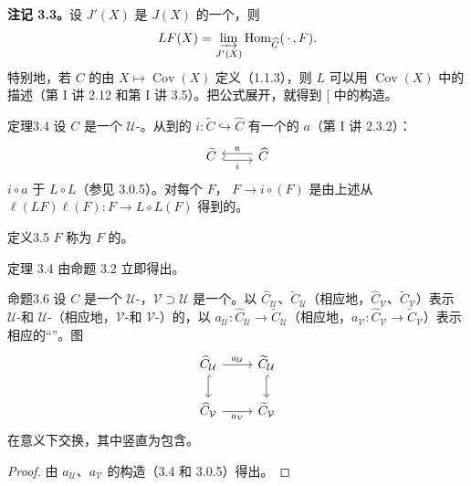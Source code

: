 \textbf{注记 3.3。}设 $J'(X)$ 是 $J(X)$ 的一个，则
\[LF(X)=\varinjlim_{J'(X)}\operatorname{Hom}_{\widehat C}(\,\cdot\,,F).\]
特别地，若 $C$ 的由 $X\mapsto\operatorname{Cov}(X)$ 定义（1.1.3），则 $L$ 可以用 $\operatorname{Cov}(X)$ 中的描述（第 I 讲 2.12 和第 I 讲 3.5）。把公式展开，就得到 [ 中的构造。
\begin{SGAresult}{定理}{3.4}
设 $C$ 是一个 $\mathcal U$-。从到的 $i:\widetilde C\hookrightarrow\widehat C$ 有一个的 $a$（第 I 讲 2.3.2）：
\[\begin{tikzcd}\widetilde C\arrow[r,hook,shift right=0.6ex,"i"']&\widehat C\arrow[l,shift right=0.6ex,"a"']\end{tikzcd}\]
 $i\circ a$ 于 $L\circ L$（参见 3.0.5）。对每个 $F$， $F\to i\circ(F)$ 是由上述从 $\ell(LF)\ell(F):F\to L\circ L(F)$ 得到的。
\end{SGAresult}
\begin{SGAresult}{定义}{3.5}
 $F$ 称为 $F$ 的。
\end{SGAresult}
定理 3.4 由命题 3.2 立即得出。
\begin{SGAresult}{命题}{3.6}
设 $C$ 是一个 $\mathcal U$-，$\mathcal V\supset\mathcal U$ 是一个。以 $\widehat C_{\mathcal U}$、$\widetilde C_{\mathcal U}$（相应地，$\widehat C_{\mathcal V}$、$\widetilde C_{\mathcal V}$）表示 $\mathcal U$-和 $\mathcal U$-（相应地，$\mathcal V$-和 $\mathcal V$-）的，以 $a_{\mathcal U}:\widehat C_{\mathcal U}\to\widetilde C_{\mathcal U}$（相应地，$a_{\mathcal V}:\widehat C_{\mathcal V}\to\widetilde C_{\mathcal V}$）表示相应的“”。图
\[\begin{tikzcd}
\widehat C_{\mathcal U}\arrow[r,"a_{\mathcal U}"]\arrow[d,hook]&\widetilde C_{\mathcal U}\arrow[d,hook]\\
\widehat C_{\mathcal V}\arrow[r,"a_{\mathcal V}"']&\widetilde C_{\mathcal V}
\end{tikzcd}\]
在意义下交换，其中竖直为包含。
\end{SGAresult}
\begin{proof}由 $a_{\mathcal U}$、$a_{\mathcal V}$ 的构造（3.4 和 3.0.5）得出。\end{proof}

